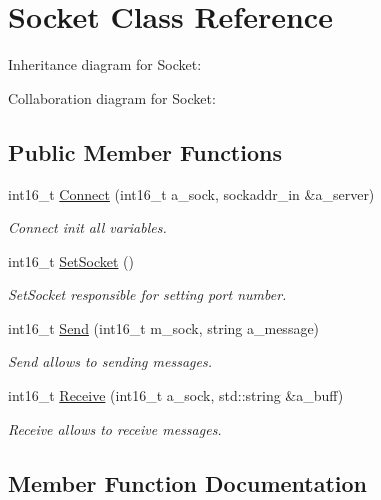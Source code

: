 \hypertarget{classSocket}{}\section{Socket Class Reference}
\label{classSocket}


Inheritance diagram for Socket\+:


Collaboration diagram for Socket\+:
\subsection*{Public Member Functions}
\begin{DoxyCompactItemize}
\item 
int16\+\_\+t \hyperlink{classSocket_a9e5bd54a401be6e857d04747b5a56e3b}{Connect} (int16\+\_\+t a\+\_\+sock, sockaddr\+\_\+in \&a\+\_\+server)
\begin{DoxyCompactList}\small\item\em Connect init all variables. \end{DoxyCompactList}\item 
int16\+\_\+t \hyperlink{classSocket_a2d21d68d80773af4249688a6558d6af2}{Set\+Socket} ()
\begin{DoxyCompactList}\small\item\em Set\+Socket responsible for setting port number. \end{DoxyCompactList}\item 
int16\+\_\+t \hyperlink{classSocket_ae463772857e203f2db5772e7f2d4d090}{Send} (int16\+\_\+t m\+\_\+sock, string a\+\_\+message)
\begin{DoxyCompactList}\small\item\em Send allows to sending messages. \end{DoxyCompactList}\item 
int16\+\_\+t \hyperlink{classSocket_a83148e173881a801cd0b978807a33a17}{Receive} (int16\+\_\+t a\+\_\+sock, std\+::string \&a\+\_\+buff)
\begin{DoxyCompactList}\small\item\em Receive allows to receive messages. \end{DoxyCompactList}\end{DoxyCompactItemize}


\subsection{Member Function Documentation}
